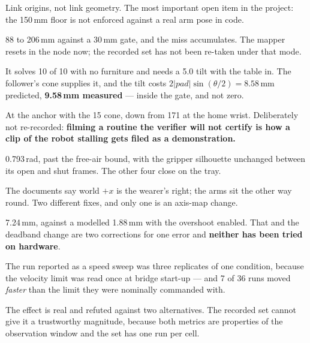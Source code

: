 
{Link origins, not link geometry. The most important open item in the project:
the 150\,mm floor is not enforced against a real arm pose in code.}

{88 to 206\,mm against a 30\,mm gate, and the miss accumulates. The mapper resets
in the node now; the recorded set has not been re-taken under that mode.}

{It solves 10 of 10 with no furniture and needs a 5.0\dg{} tilt with the table
in. The follower's cone supplies it, and the tilt costs
$2|pad|\sin(\theta/2) = 8.58$\,mm predicted, \textbf{9.58\,mm measured} ---
inside the gate, and not zero.}

{At the anchor with the 15\dg{} cone, down from 171 at the home wrist.
Deliberately not re-recorded: \textbf{filming a routine the verifier will not
certify is how a clip of the robot stalling gets filed as a demonstration.}}

{0.793\,rad, past the free-air bound, with the gripper silhouette unchanged
between its open and shut frames. The other four close on the tray.}

{The documents say world $+x$ is the wearer's right; the arms sit the other way
round. Two different fixes, and only one is an axis-map change.}

{7.24\,mm, against a modelled 1.88\,mm with the overshoot enabled. That and the
deadband change are two corrections for one error and \textbf{neither has been
tried on hardware}.}

{The run reported as a speed sweep was three replicates of one condition,
because the velocity limit was read once at bridge start-up --- and 7 of 36 runs
moved \emph{faster} than the limit they were nominally commanded with.}

{The effect is real and refuted against two alternatives. The recorded set cannot
give it a trustworthy magnitude, because both metrics are properties of the
observation window and the set has one run per cell.}

